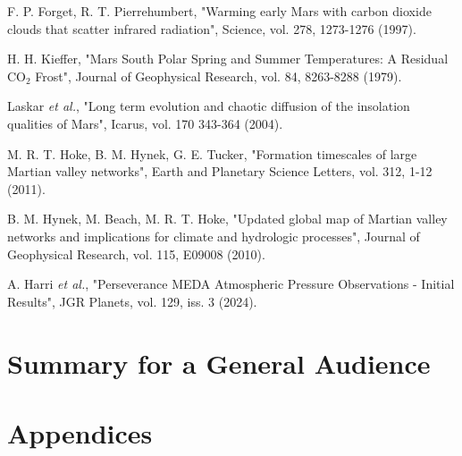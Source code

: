 \documentclass[12pt,onecolumn]{revtex4-2}    %
\begin{document}
\begin{thebibliography}{}
 F. P. Forget, R. T. Pierrehumbert, "Warming early Mars with carbon dioxide clouds that scatter infrared radiation", Science, vol. 278, 1273-1276 (1997).

 H. H. Kieffer, "Mars South Polar Spring and Summer Temperatures: A Residual $\mathrm{CO_2}$ Frost", Journal of Geophysical Research, vol. 84, 8263-8288 (1979).

 Laskar \textit{et al.}, "Long term evolution and chaotic diffusion of the insolation qualities of Mars", Icarus, vol. 170 343-364 (2004).

 M. R. T. Hoke, B. M. Hynek, G. E. Tucker, "Formation timescales of large Martian valley networks", Earth and Planetary Science Letters, vol. 312, 1-12 (2011).

 B. M. Hynek, M. Beach, M. R. T. Hoke, "Updated global map of Martian valley networks and implications for climate and hydrologic processes", Journal of Geophysical Research, vol. 115, E09008 (2010).

 A. Harri \textit{et al.}, "Perseverance MEDA Atmospheric Pressure Observations - Initial Results", JGR Planets, vol. 129, iss. 3 (2024).

\end{thebibliography} 

\newpage
 
\section{Summary for a General Audience}
\clearpage

\newpage

\section{Appendices}
\end{document}
